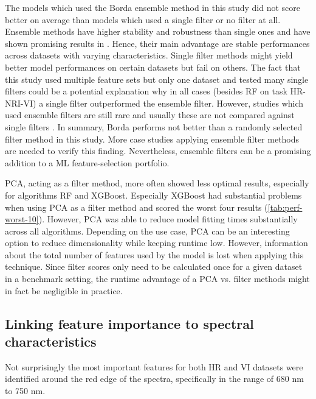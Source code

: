\documentclass[remotesensing,article,submit,moreauthors,pdftex]{Definitions/mdpi}
\begin{document}
The models which used the Borda ensemble method in this study did not score better on average than models which used a single filter or no filter at all.
Ensemble methods have higher stability and robustness than single ones and have shown promising results in \cite{drotar2017a}.
Hence, their main advantage are stable performances across datasets with varying characteristics.
Single filter methods might yield better model performances on certain datasets but fail on others.
The fact that this study used multiple feature sets but only one dataset and tested many single filters could be a potential explanation why in all cases (besides RF on task HR-NRI-VI) a single filter outperformed the ensemble filter.
However, studies which used ensemble filters are still rare and usually these are not compared against single filters \cite{ghosh2019}.
In summary, Borda performs not better than a randomly selected filter method in this study.
More case studies applying ensemble filter methods are needed to verify this finding.
Nevertheless, ensemble filters can be a promising addition to a ML feature-selection portfolio.

PCA, acting as a filter method, more often showed less optimal results, especially for algorithms RF and XGBoost.
Especially XGBoost had substantial problems when using PCA as a filter method and scored the worst four results (\autoref{tab:perf-worst-10}).
However, PCA was able to reduce model fitting times substantially across all algorithms.
Depending on the use case, PCA can be an interesting option to reduce dimensionality while keeping runtime low.
However, information about the total number of features used by the model is lost when applying this technique.
Since filter scores only need to be calculated once for a given dataset in a benchmark setting, the runtime advantage of a PCA vs. filter methods might in fact be negligible in practice.

\subsection{Linking feature importance to spectral characteristics}

Not surprisingly the most important features for both HR and VI datasets were identified around the red edge of the spectra, specifically in the range of 680 nm to 750 nm.
\end{document}
